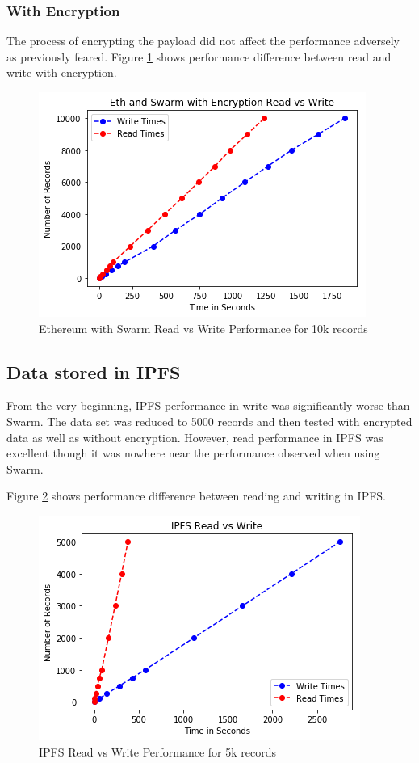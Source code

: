 \documentclass[11pt,openright]{report}
\begin{document}
\subsubsection{With Encryption}
The process of encrypting the payload did not affect the performance adversely as previously feared. Figure \ref{fig:graph_eth_swarm_encr_readvwrite} shows performance difference between read and write with encryption.

\begin{figure}
    \centering
    \includegraphics[scale=1]{results/graphs/Eth_Swarm_Read_v_Write_Encr.png}
    \caption{Ethereum with Swarm Read vs Write Performance for 10k records}
    \label{fig:graph_eth_swarm_encr_readvwrite}
\end{figure}

\subsection{Data stored in IPFS}
From the very beginning, IPFS performance in write was significantly worse than Swarm. The data set was reduced to 5000 records and then tested with encrypted data as well as without encryption. However, read performance in IPFS was excellent though it was nowhere near the performance observed when using Swarm.

Figure \ref{fig:graph_ipfs_readvwrite} shows performance difference between reading and writing in IPFS.

\begin{figure}
    \centering
    \includegraphics[scale=1]{results/graphs/IPFS_Read_v_Write.png}
    \caption{IPFS Read vs Write Performance for 5k records}
    \label{fig:graph_ipfs_readvwrite}
\end{figure}
\end{document}
